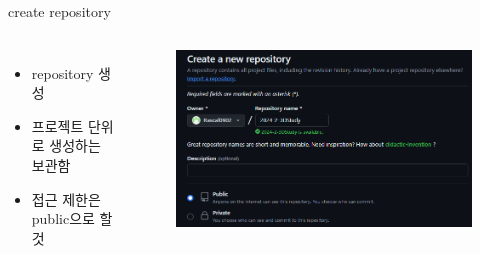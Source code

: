 \documentclass[12pt]{beamer}
\begin{document}
\begin{frame}{create repository}
    \begin{columns}
            \begin{itemize}
                \item repository 생성 \newline
                \item 프로젝트 단위로 생성하는 보관함 \newline
                \item 접근 제한은 public으로 할 것 
            \end{itemize}

            \begin{figure}[t]
            \centering
            \includegraphics[width=1.0\textwidth]{image/create_repository.png}
            \end{figure}
    \end{columns}
\end{frame}
\end{document}
